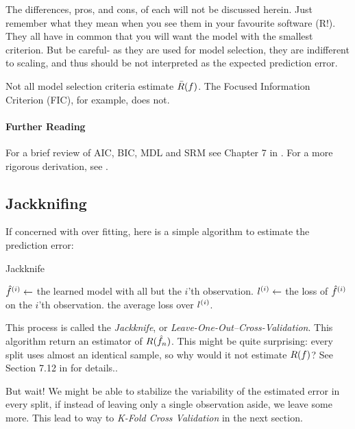 The differences, pros, and cons, of each will not be discussed herein. Just remember what they mean when you see them in your favourite software (R!).
They all have in common that you will want the model with the smallest criterion.
But be careful- as they are used for model selection, they are indifferent to scaling, and thus should be not interpreted as the expected prediction error.

\begin{remark}
Not all model selection criteria estimate $\bar{R}(f)$. The Focused Information Criterion (FIC), for example, does not.
\end{remark}





\paragraph{Further Reading}
For a brief review of AIC, BIC, MDL and SRM see Chapter 7 in \citep{hastie_elements_2003}. 
For a more rigorous derivation, see \cite{claeskens_model_2008}.





\subsection{Jackknifing}
\label{sec:jackknife}

If concerned with over fitting, here is a simple algorithm to estimate the prediction error:

\begin{algorithm}[H]
\caption{Jackknife}
\begin{algorithmic}
    \State $\hat{f}^{(i)} \gets$ the learned model with all but the $i$'th observation.
    \State $l^{(i)} \gets$ the loss of $\hat{f}^{(i)}$ on the $i$'th observation.
\EndFor
\State \Return the average loss over $l^{(i)}$.
\end{algorithmic}
\end{algorithm}

This process is called the \emph{Jackknife}, or \emph{Leave-One-Out--Cross-Validation}. 
This algorithm return an estimator of $R(\hat{f}_n)$.
This might be quite surprising: every split uses almost an identical sample, so why would it not estimate $R(f)$? See Section 7.12 in \cite{hastie_elements_2003} for details..

But wait! We might be able to stabilize the variability of the estimated error in every split, if instead of leaving only a single observation aside, we leave some more. This lead to way to \emph{K-Fold Cross Validation} in the next section.


